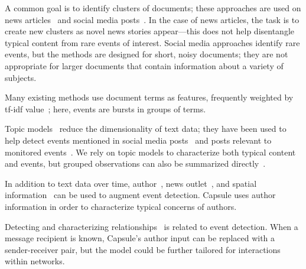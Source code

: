 A common goal is to identify clusters of documents; these approaches are used on news articles~\cite{zhao2012novel,zhao2007temporal,zhang2002novelty,li2005probabilistic,wang2007mining,allan1998line} and social media posts~\cite{VanDam:2012,lau2012line,jackoway2011identification,sakaki2010earthquake,reuter2012event,becker2010learning,sayyadi2009event}.  
In the case of news articles, the task is to create new clusters as novel news stories appear---this does not help disentangle typical content from rare events of interest.
Social media approaches identify rare events, but the methods are designed for short, noisy documents; they are not appropriate for larger documents that contain information about a variety of subjects.

Many existing methods use document terms as features, frequently weighted by tf-idf value~\cite{fung2005parameter,kumaran2004text,brants2003system,das2011dynamic,zhao2007temporal,zhao2012novel}; here, events are bursts in groups of terms. %

Topic models~\cite{Blei:2012} reduce the dimensionality of text data; they have been used to help detect events mentioned in social media posts~\cite{lau2012line,dou2012leadline} and posts relevant to monitored events~\cite{VanDam:2012}.
We rely on topic models to characterize both typical content and events, but grouped observations can also be summarized directly~\cite{peng2007event,chakrabarti2011event,gao2012joint}.

In addition to text data over time, author~\cite{zhao2007temporal}, news outlet~\cite{wang2007mining}, and spatial information~\cite{Neill:2005,mathioudakis2010identifying,liu2011using} can be used to augment event detection.  Capsule uses author information in order to characterize typical concerns of authors.

Detecting and characterizing relationships~\cite{schein2015bayesian,linderman2014discovering,das2011dynamic} is related to event detection.  When a message recipient is known, Capsule's author input can be replaced with a sender-receiver pair, but the model could be further tailored for interactions within networks.

